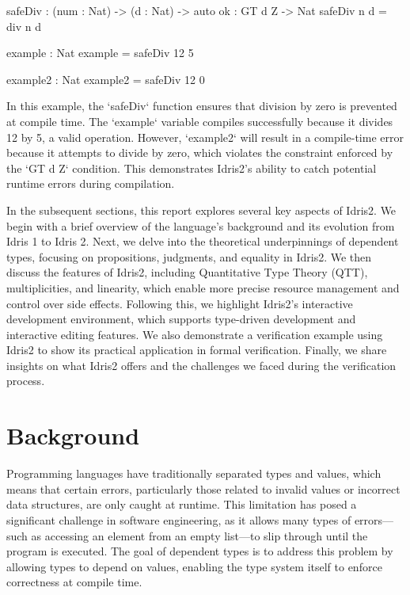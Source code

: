 \documentclass[]{rptuseminar}
\begin{document}
\begin{idris}
safeDiv : (num : Nat) -> (d : Nat) -> {auto ok : GT d Z} -> Nat  
safeDiv n d  = div n d  

example : Nat  
example = safeDiv 12 5

example2 : Nat
example2 = safeDiv 12 0
\end{idris}

In this example, the `safeDiv` function ensures that division by zero is prevented at compile time. The `example` variable compiles successfully because it divides 12 by 5, a valid operation. However, `example2` will result in a compile-time error because it attempts to divide by zero, which violates the constraint enforced by the `GT d Z` condition. This demonstrates Idris2's ability to catch potential runtime errors during compilation.

In the subsequent sections, this report explores several key aspects of Idris2. We begin with a brief overview of the language's background and its evolution from Idris 1 to Idris 2. Next, we delve into the theoretical underpinnings of dependent types, focusing on propositions, judgments, and equality in Idris2. We then discuss the features of Idris2, including Quantitative Type Theory (QTT), multiplicities, and linearity, which enable more precise resource management and control over side effects. Following this, we highlight Idris2's interactive development environment, which supports type-driven development and interactive editing features. We also demonstrate a verification example using Idris2 to show its practical application in formal verification. Finally, we share insights on what Idris2 offers and the challenges we faced during the verification process.

\section{Background}  
\label{sec:background}  

Programming languages have traditionally separated types and values, which means that certain errors, particularly those related to invalid values or incorrect data structures, are only caught at runtime. This limitation has posed a significant challenge in software engineering, as it allows many types of errors—such as accessing an element from an empty list—to slip through until the program is executed. The goal of dependent types is to address this problem by allowing types to depend on values, enabling the type system itself to enforce correctness at compile time.
\end{document}
